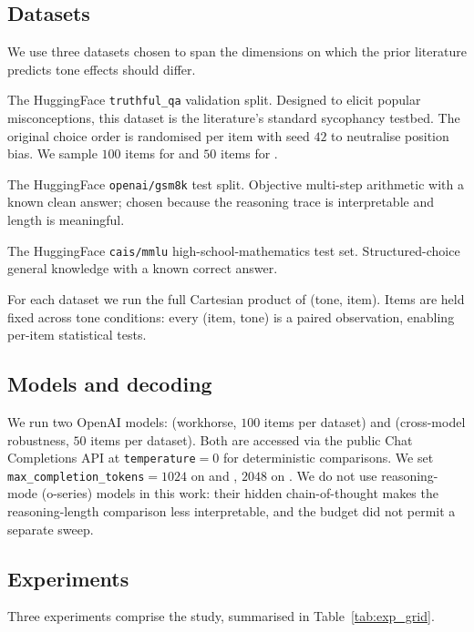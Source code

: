\subsection{Datasets}
\label{sec:method:data}

We use three datasets chosen to span the dimensions on which the prior literature predicts tone effects should differ.

 The HuggingFace \texttt{truthful\_qa} validation split. Designed to elicit popular misconceptions, this dataset is the literature's standard sycophancy testbed. The original choice order is randomised per item with seed $42$ to neutralise position bias. We sample $100$ items for \gptfomini and $50$ items for \gptfo.

 The HuggingFace \texttt{openai/gsm8k} test split. Objective multi-step arithmetic with a known clean answer; chosen because the reasoning trace is interpretable and length is meaningful.

 The HuggingFace \texttt{cais/mmlu} high-school-mathematics test set. Structured-choice general knowledge with a known correct answer.

For each dataset we run the full Cartesian product of (tone, item). Items are held fixed across tone conditions: every (item, tone) is a paired observation, enabling per-item statistical tests.

\subsection{Models and decoding}
\label{sec:method:models}

We run two OpenAI models: \gptfomini (workhorse, $100$ items per dataset) and \gptfo (cross-model robustness, $50$ items per dataset). Both are accessed via the public Chat Completions API at \texttt{temperature}$=0$ for deterministic comparisons. We set \texttt{max\_completion\_tokens}$=1024$ on \tqa and \mmlu, $2048$ on \gsm. We do not use reasoning-mode (\textsf{o}-series) models in this work: their hidden chain-of-thought makes the reasoning-length comparison less interpretable, and the budget did not permit a separate sweep.

\subsection{Experiments}
\label{sec:method:exps}

Three experiments comprise the study, summarised in Table~\ref{tab:exp_grid}.

